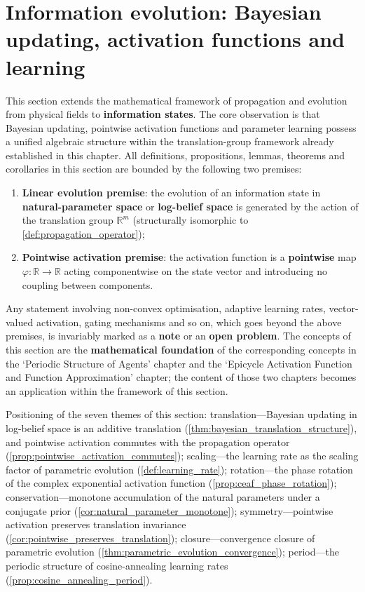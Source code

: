 \section{Information evolution: Bayesian updating, activation functions and learning}\label{sec:information_evolution}

\begin{remark}\label{rem:information_evolution_positioning}
This section extends the mathematical framework of propagation and evolution from physical fields to \textbf{information states}. The core observation is that Bayesian updating, pointwise activation functions and parameter learning possess a unified algebraic structure within the translation-group framework already established in this chapter. All definitions, propositions, lemmas, theorems and corollaries in this section are bounded by the following two premises:

\begin{enumerate}[label=(\alph*)]
    \item \textbf{Linear evolution premise}: the evolution of an information state in \textbf{natural-parameter space} or \textbf{log-belief space} is generated by the action of the translation group $\mathbb{R}^m$ (structurally isomorphic to \cref{def:propagation_operator});
    \item \textbf{Pointwise activation premise}: the activation function is a \textbf{pointwise} map $\varphi:\mathbb{R}\to\mathbb{R}$ acting componentwise on the state vector and introducing no coupling between components.
\end{enumerate}

Any statement involving non-convex optimisation, adaptive learning rates, vector-valued activation, gating mechanisms and so on, which goes beyond the above premises, is invariably marked as a \textbf{note} or an \textbf{open problem}. The concepts of this section are the \textbf{mathematical foundation} of the corresponding concepts in the `Periodic Structure of Agents' chapter and the `Epicycle Activation Function and Function Approximation' chapter; the content of those two chapters becomes an application within the framework of this section.

Positioning of the seven themes of this section: translation---Bayesian updating in log-belief space is an additive translation (\cref{thm:bayesian_translation_structure}), and pointwise activation commutes with the propagation operator (\cref{prop:pointwise_activation_commutes}); scaling---the learning rate as the scaling factor of parametric evolution (\cref{def:learning_rate}); rotation---the phase rotation of the complex exponential activation function (\cref{prop:ceaf_phase_rotation}); conservation---monotone accumulation of the natural parameters under a conjugate prior (\cref{cor:natural_parameter_monotone}); symmetry---pointwise activation preserves translation invariance (\cref{cor:pointwise_preserves_translation}); closure---convergence closure of parametric evolution (\cref{thm:parametric_evolution_convergence}); period---the periodic structure of cosine-annealing learning rates (\cref{prop:cosine_annealing_period}).
\end{remark}

